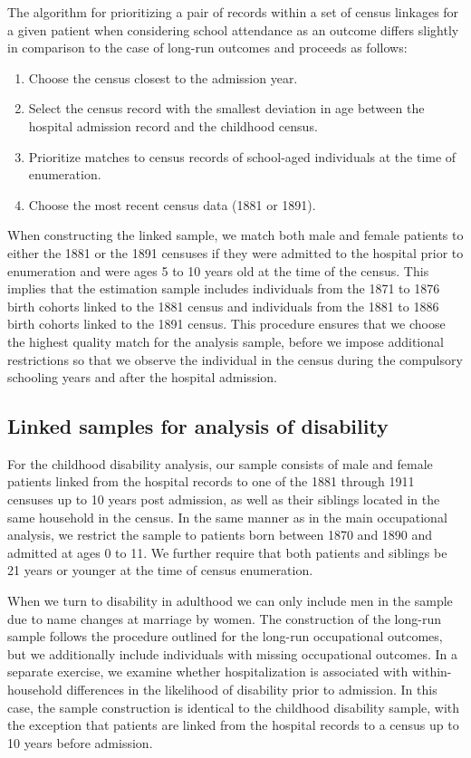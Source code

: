 \documentclass[12pt,english]{article}
\begin{document}
The algorithm for prioritizing a pair of records within a set of census linkages for a given patient when considering school attendance as an outcome differs slightly in comparison to the case of long-run outcomes and proceeds as follows:

\begin{enumerate}
    \item Choose the census closest to the admission year.
    \item Select the census record with the smallest deviation in age between the hospital admission record and the childhood census.
    \item Prioritize matches to census records of school-aged individuals at the time of enumeration.
    \item Choose the most recent census data (1881 or 1891).
\end{enumerate}

When constructing the linked sample, we match both male and female patients to either the 1881 or the 1891 censuses if they were admitted to the hospital prior to enumeration and were ages 5 to 10 years old at the time of the census. This implies that the estimation sample includes individuals from the 1871 to 1876 birth cohorts linked to the 1881 census and individuals from the 1881 to 1886 birth cohorts linked to the 1891 census. This procedure ensures that we choose the highest quality match for the analysis sample, before we impose additional restrictions so that we observe the individual in the census during the compulsory schooling years and after the hospital admission. 

\subsection{Linked samples for analysis of disability\label{sec:linking-disability}}

For the childhood disability analysis, our sample consists of male and female patients linked from the hospital records to one of the 1881 through 1911 censuses up to 10 years post admission, as well as their siblings located in the same household in the census. In the same manner as in the main occupational analysis, we restrict the sample to patients born between 1870 and 1890 and admitted at ages 0 to 11. We further require that both patients and siblings be 21 years or younger at the time of census enumeration. 

When we turn to disability in adulthood we can only include men in the sample due to name changes at marriage by women. The construction of the long-run sample follows the procedure outlined for the long-run occupational outcomes, but we additionally include individuals with missing occupational outcomes. In a separate exercise, we examine whether hospitalization is associated with within-household differences in the likelihood of disability prior to admission. In this case, the sample construction is identical to the childhood disability sample, with the exception that patients are linked from the hospital records to a census up to 10 years before admission.
\end{document}
